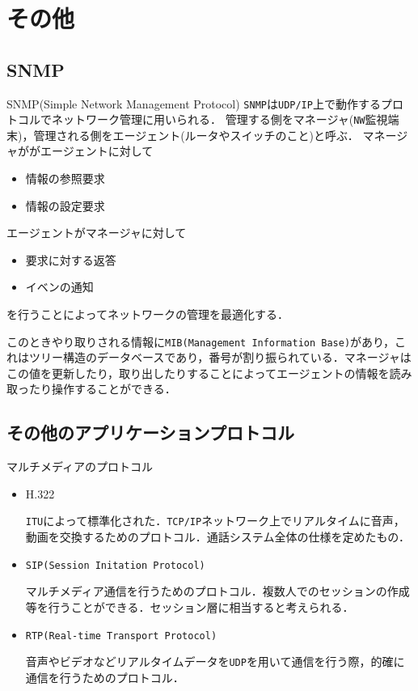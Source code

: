 \documentclass[11pt, aspectratio=169]{beamer}
\begin{document}
\section{その他}

\subsection{SNMP}
\begin{frame}{SNMP(Simple Network Management Protocol)}
  \texttt{SNMP}は\texttt{UDP/IP}上で動作するプロトコルでネットワーク管理に用いられる．
  管理する側をマネージャ(\texttt{NW}監視端末)，管理される側をエージェント(ルータやスイッチのこと)と呼ぶ．
  マネージャががエージェントに対して
  \begin{itemize}
    \item 情報の参照要求
    \item 情報の設定要求
  \end{itemize}
  エージェントがマネージャに対して
  \begin{itemize}
    \item 要求に対する返答
    \item イベンの通知
  \end{itemize}
  を行うことによってネットワークの管理を最適化する．

  このときやり取りされる情報に\texttt{MIB(Management Information Base)}があり，これはツリー構造のデータベースであり，番号が割り振られている．マネージャはこの値を更新したり，取り出したりすることによってエージェントの情報を読み取ったり操作することができる．
\end{frame}

\subsection{その他のアプリケーションプロトコル}
\begin{frame}{マルチメディアのプロトコル}
  \begin{itemize}
    \item H.322

      \texttt{ITU}によって標準化された．\texttt{TCP/IP}ネットワーク上でリアルタイムに音声，動画を交換するためのプロトコル．通話システム全体の仕様を定めたもの．

    \item \texttt{SIP(Session Initation Protocol)}

      マルチメディア通信を行うためのプロトコル．複数人でのセッションの作成等を行うことができる．セッション層に相当すると考えられる．

    \item \texttt{RTP(Real-time Transport Protocol)}

      音声やビデオなどリアルタイムデータを\texttt{UDP}を用いて通信を行う際，的確に通信を行うためのプロトコル．
  \end{itemize}
\end{frame}
\end{document}
